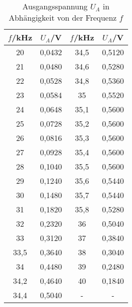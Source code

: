 \begin{table}[h!]
  \centering
  \caption{Ausgangsspannung $U_A$ in Abhängigkeit von der Frequenz $f$}
  \label{tab:Q}
  \begin{tabular}{c c c c}
    \toprule
      $f$/kHz & $U_A$/V & $f$/kHz  & $U_A$/V  \\
    \midrule
    20    &   0,0432    &   34,5  &   0,5120 \\
    21    &   0,0480    &   34,6  &   0,5280  \\
    22    &   0,0528    &   34,8  &   0,5360  \\
    23    &   0,0584    &   35    &   0,5520  \\
    24    &   0,0648    &   35,1  &   0,5600  \\
    25    &   0,0728    &   35,2  &   0,5600  \\
    26    &   0,0816    &   35,3  &   0,5600  \\
    27    &   0,0928    &   35,4  &   0,5600  \\
    28    &   0,1040    &   35,5  &   0,5600  \\
    29    &   0,1240    &   35,6  &   0,5440  \\
    30    &   0,1480    &   35,7  &   0,5440  \\
    31    &   0,1820    &   35,8  &   0,5280  \\
    32    &   0,2320    &   36    &   0,5040  \\
    33    &   0,3120    &   37    &   0,3840  \\
    33,5  &   0,3640    &   38    &   0,3040  \\
    34    &   0,4480    &   39    &   0,2480  \\
    34,2  &   0,4640    &   40    &   0,1840  \\
    34,4  &   0,5040    &   -     &   -       \\

    \bottomrule
  \end{tabular}
\end{table}
